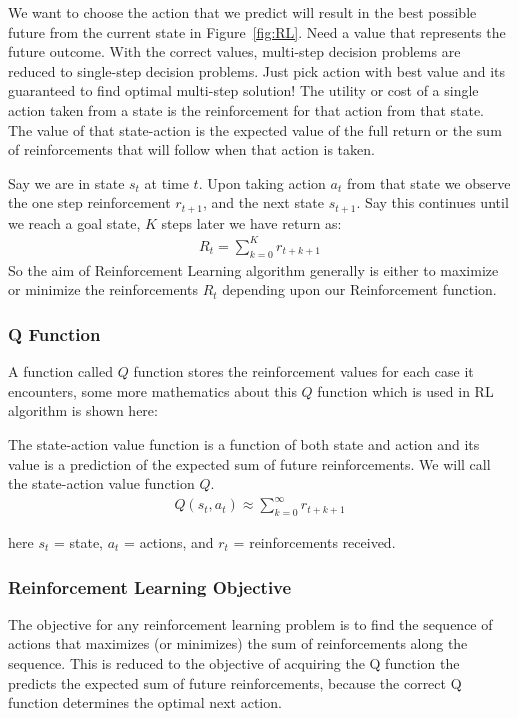 \documentclass[12pt]{report}
\begin{document}
We want to choose the action that we predict will result in the best possible future from the current state in Figure~\ref{fig:RL}. Need a value that represents the future outcome. With the correct values, multi-step decision problems are reduced to single-step decision problems. Just pick action with best value and its guaranteed to find optimal multi-step solution! The utility or cost of a single action taken from a state is the reinforcement for that action from that state. The value of that state-action is the expected value of the full return or the sum of reinforcements that will follow when that action is taken.\par
Say we are in state $s_t$ at time $t$. Upon taking action $a_t$ from that state we observe the one step reinforcement $r_{t+1}$, and the next state $s_{t+1}$. Say this continues until we reach a goal state, $K$ steps later we have return as:
 \begin{align*}
      R_t = \sum_{k=0}^K r_{t+k+1}
  \end{align*}
So the aim of Reinforcement Learning algorithm generally is either to maximize or minimize the reinforcements $R_t$ depending upon our Reinforcement function.

\subsubsection{Q Function}
A function called $Q$ function stores the reinforcement values for each case it encounters, some more mathematics about this $Q$ function which is used in RL algorithm is shown here:

The state-action value function is a function of both state and action and its value is a prediction of the expected sum of future reinforcements. We will call the state-action value function $Q$.
\begin{align*}
      Q(s_t,a_t) \approx \sum_{k=0}^\infty r_{t+k+1}
\end{align*}

here $s_t$ = state, $a_t$ = actions, and $r_t$ = reinforcements received.


\subsubsection{Reinforcement Learning Objective}
The objective for any reinforcement learning problem is to find the sequence of actions that maximizes (or minimizes) the sum of reinforcements along the sequence. This is reduced to the objective of acquiring the Q function the predicts the expected sum of future reinforcements, because the correct Q function determines the optimal next action.
\end{document}
